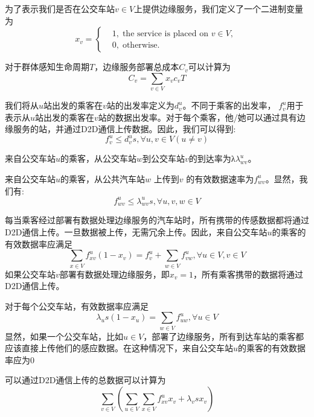 为了表示我们是否在公交车站$v\in V$上提供边缘服务，我们定义了一个二进制变量为
\[
x_v =\left\{
\begin{aligned}
&1, \; \text{the service is placed on $v\in V$, }\\
&0, \; \text{otherwise}.
\end{aligned}
\right.
\]

对于群体感知生命周期$T$，边缘服务部署总成本$C_v$可以计算为
\begin{equation}
C_v = \sum_{v\in V}x_v c_v T
\end{equation}

我们将从$u$站出发的乘客在$v$站的出发率定义为$d^u_v$。不同于乘客的出发率， $f^u_v$用于表示从$u$站出发的乘客在$v$站的数据出发率。对于每个乘客，他/她可以通过具有边缘服务的站，并通过D2D通信上传数据。因此，我们可以得到:
\begin{equation}
f^u_v \leq d^u_v s, \forall u, v\in V (u \neq v)
\end{equation}

来自公交车站$u$的乘客，从公交车站$w$到公交车站$v$的到达率为λ$\lambda^u_{wv}$。

来自公交车站$u$的乘客，从公共汽车站$w$ 上传到$v$ 的有效数据速率为$f^u_{wv}$。显然，我们有:
\begin{equation}
	f^u_{wv} \leq \lambda^u_{wv} s, \forall u, v, w \in V
\end{equation}

每当乘客经过部署有数据处理边缘服务的汽车站时，所有携带的传感数据都将通过D2D通信上传。一旦数据被上传，无需冗余上传。因此，来自公交车站$u$的乘客的有效数据率应满足
\begin{equation}
    \sum_{x\in V}f^u_{xv} (1-x_v) = f^u_v + \sum_{w\in V}f^u_{vw}, \forall u\in V, v\in V
\end{equation}
如果公交车站$v$部署有数据处理边缘服务，即$x_v = 1$，所有乘客携带的数据将通过D2D通信上传。 

对于每个公交车站，有效数据率应满足
\begin{equation}
	\lambda_u s (1 - x_u) = \sum_{w\in V}f^u_{uw}, \forall u\in V
\end{equation}
显然，如果一个公交车站，比如$u\in V$，部署了边缘服务，所有到达车站的乘客都应该直接上传他们的感应数据。在这种情况下，来自公交车站$u$的乘客的有效数据率应为0

可以通过D2D通信上传的总数据可以计算为
\begin{equation}
	\sum_{v\in V}(\sum_{u\in V}\sum_{x\in V}f^u_{xv} x_v + \lambda_v s x_v)
\end{equation}

